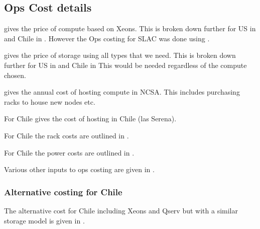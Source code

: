 \subsection{Ops Cost details}\label{sec:opsdetails}
 gives the price of compute based on Xeons.
This is broken down further for US in  and Chile in .
However the Ops costing for SLAC was done using .

 gives the price of storage using all  types that we need.
This is broken down further for US in  and Chile in 
This would be needed regardless of the compute chosen.









 gives the annual cost of hosting compute in NCSA. This includes purchasing racks to house
new nodes etc.


For Chile  gives the cost of hosting in Chile (las Serena).


For Chile the rack costs are outlined in .


For Chile the power costs are outlined in .


Various other inputs to ops costing are given in .



\subsubsection{Alternative costing for Chile}
The alternative cost for Chile including Xeons and Qserv but with a similar storage model is given in .

